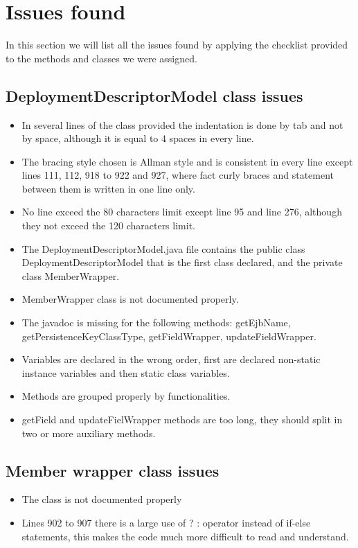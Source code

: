 \section{Issues found}
In this section we will list all the issues found by applying the checklist provided to the methods and classes we were assigned.

\subsection{DeploymentDescriptorModel class issues}
\begin{itemize}
	\item In several lines of the class provided the indentation is done by tab and not by space, although it is equal to 4 spaces in every line.
	\item The bracing style chosen is Allman style and is consistent in every line except lines 111, 112, 918 to 922 and 927, where fact curly braces and statement between them is written in one line only. 
	\item No line exceed the 80 characters limit except line 95 and line 276, although they not exceed the 120 characters limit.
	\item The DeploymentDescriptorModel.java file contains the public class DeploymentDescriptorModel that is the first class declared, and the private class MemberWrapper.
	\item MemberWrapper class is not documented properly.
	\item The javadoc is missing for the following methods: getEjbName, getPersistenceKeyClassType, getFieldWrapper, updateFieldWrapper.
	\item Variables are declared in the wrong order, first are declared non-static instance variables and then static class variables.
	\item Methods are grouped properly by functionalities.
	\item getField and updateFielWrapper methods are too long, they should split in two or more auxiliary methods.
\end{itemize}

\subsection{Member wrapper class issues}
\begin{itemize}
	\item The class is not documented properly
	\item Lines 902 to 907 there is a large use of ? : operator instead of if-else statements, this makes the code much more difficult to read and understand.
\end{itemize}
